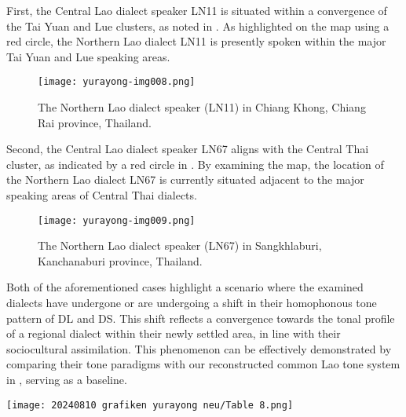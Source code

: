 \documentclass[output=paper]{langscibook}
\begin{document}
First, the Central Lao dialect speaker LN11 is situated within a convergence of the Tai Yuan and Lue clusters, as noted in . As highlighted on the map using a red circle, the Northern Lao dialect LN11 is presently spoken within the major Tai Yuan and Lue speaking areas.

 
\begin{figure}
\texttt{[image: yurayong-img008.png]}
\caption{\label{fig:yurayong:8}The Northern Lao dialect speaker (LN11) in Chiang Khong, Chiang Rai province, Thailand.}
\end{figure}

Second, the Central Lao dialect speaker LN67 aligns with the Central Thai cluster, as indicated by a red circle in . By examining the map, the location of the Northern Lao dialect LN67 is currently situated adjacent to the major speaking areas of Central Thai dialects.

 
\begin{figure}
\texttt{[image: yurayong-img009.png]}
\caption{\label{fig:yurayong:9}The Northern Lao dialect speaker (LN67) in Sangkhlaburi, Kanchanaburi province, Thailand.}
\end{figure}

Both of the aforementioned cases highlight a scenario where the examined dialects have undergone or are undergoing a shift in their homophonous tone pattern of DL and DS. This shift reflects a convergence towards the tonal profile of a regional dialect within their newly settled area, in line with their sociocultural assimilation. This phenomenon can be effectively demonstrated by comparing their tone paradigms with our reconstructed common Lao tone system in , serving as a baseline.

\begin{table}
\texttt{[image: 20240810 grafiken yurayong neu/Table 8.png]}
\caption{A reconstructed tone paradigm of common Lao.}
\label{tab:yurayong:8}
\end{table}
\end{document}
